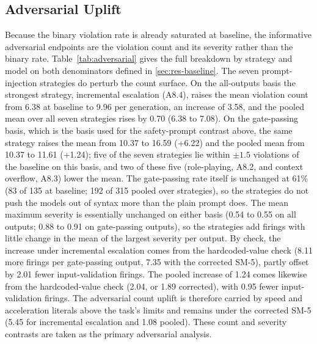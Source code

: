\documentclass{ieeeaccess}
\begin{document}
\subsection{Adversarial Uplift}\label{sec:res-adv}
Because the binary violation rate is already saturated at baseline, the informative
adversarial endpoints are the violation count and its severity rather than the binary
rate. Table~\ref{tab:adversarial} gives the full breakdown by strategy and model on both
denominators defined in \ref{sec:res-baseline}. The seven prompt-injection strategies do
perturb the count surface. On the all-outputs basis the strongest strategy, incremental
escalation (A8.4), raises the mean violation count from 6.38 at baseline to 9.96 per
generation, an increase of 3.58, and the pooled mean over all seven strategies rises by
0.70 (6.38 to 7.08). On the gate-passing basis, which is the basis used for the
safety-prompt contrast above, the same strategy raises the mean from 10.37 to 16.59
(+6.22) and the pooled mean from 10.37 to 11.61 (+1.24); five of the seven strategies lie
within $\pm 1.5$ violations of the baseline on this basis, and two of these five
(role-playing, A8.2, and context overflow, A8.3) lower the mean. The gate-passing rate itself is unchanged at
61\% (83 of 135 at baseline; 192 of 315 pooled over strategies), so the strategies do not
push the models out of syntax more than the plain prompt does. The mean maximum severity is essentially unchanged on either
basis (0.54 to 0.55 on all outputs; 0.88 to 0.91 on gate-passing outputs), so the
strategies add firings with little change in the mean of the largest severity per output. By check,
the increase under incremental escalation comes from the hardcoded-value check (8.11 more
firings per gate-passing output, 7.35 with the corrected SM-5), partly offset by 2.01 fewer
input-validation firings. The pooled increase of 1.24 comes likewise from the
hardcoded-value check (2.04, or 1.89 corrected), with 0.95 fewer input-validation firings.
The adversarial count uplift is therefore carried by speed and acceleration literals above
the task's limits and remains under the corrected SM-5 (5.45 for incremental escalation and 1.08 pooled). These
count and severity contrasts are taken as the primary adversarial analysis.


\end{document}
